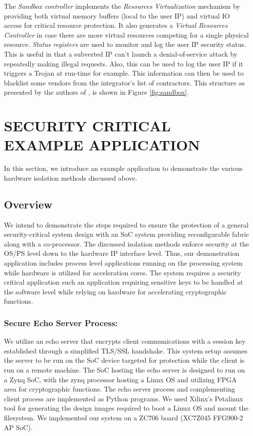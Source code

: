 \documentclass[sigconf]{acmart}
\theoremstyle{plain}
\theoremstyle{remark}
\begin{document}
The \textit{Sandbox controller} implements the \textit{Resources Virtualization} mechanism by providing both virtual memory buffers (local to the user IP) and virtual IO access for critical resource protection. It also generates a \textit{Virtual Resources Controller} in case there are more virtual resources competing for a single physical resource. \textit{Status registers} are used to monitor and log the user IP security status. This is useful in that a subverted IP can't launch a denial-of-service attack by repeatedly making illegal requests. Also, this can be used to log the user IP if it triggers a Trojan at run-time for example. This information can then be used to blacklist some vendors from the integrator's list of contractors. This structure as presented by the authors of \cite{CAPSL}, is shown in Figure \ref{fig:sandbox}.


\section{SECURITY CRITICAL EXAMPLE APPLICATION} \label{sec:application}
In this section, we introduce an example application to demonstrate the various hardware isolation methods discussed above.

\subsection{Overview}
We intend to demonstrate the steps required to ensure the protection of a general security-critical system design with an SoC system providing reconfigurable fabric along with a co-processor. The discussed isolation methods enforce security at the OS/PS level down to the hardware IP interface level. Thus, our demonstration application includes process level applications running on the processing system while hardware is utilized for acceleration cores. The system requires a security critical application such an application requiring sensitive keys to be handled at the software level while relying on hardware for accelerating cryptographic functions.

\subsubsection{Secure Echo Server Process:}
We utilize an echo server that encrypts client communications with a session key established through a simplified TLS/SSL handshake. This system setup assumes the server to be run on the SoC device targeted for protection while the client is run on a remote machine. The SoC hosting the echo server is designed to run on a Zynq SoC, with the zynq processor hosting a Linux OS and utilizing FPGA area for cryptographic functions. The echo server process and complementing client process are implemented as Python programs. We used Xilinx's Petalinux tool for generating the design images required to boot a Linux OS and mount the filesystem. We implemented our system on a ZC706 board (XC7Z045 FFG900-2 AP SoC).
\end{document}
